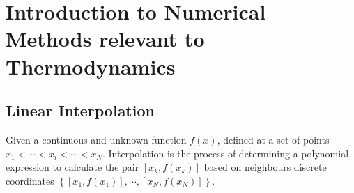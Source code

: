 
\chapter{Introduction to Numerical Methods relevant to Thermodynamics}\label{Appendix_NumMethods}

\section{Linear Interpolation}\label{LinearInterpolation}

Given a continuous and unknown function $f(x)$, defined at a set of points  $x_{1} < \cdots < x_{i} < \cdots < x_{N}$. Interpolation is the process of determining a polynomial expression to calculate the pair $\left[x_{k}, f\left(x_{k}\right)\right]$ based on neighbours discrete coordinates $\left\{\left[x_{1},f\left(x_{1}\right)\right], \cdots, \left[x_{N},f\left(x_{N}\right)\right]\right\}$. 

